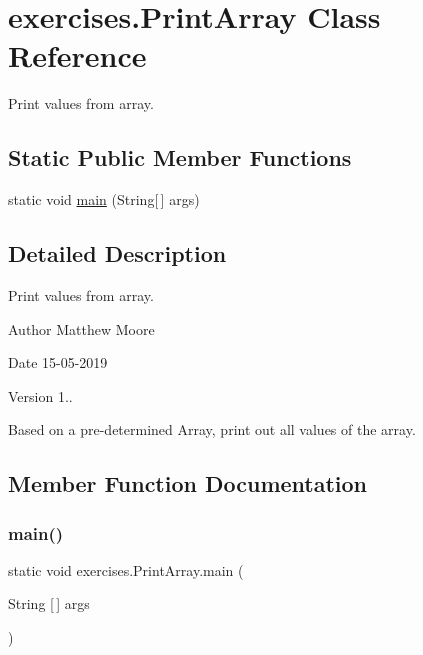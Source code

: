 \hypertarget{classexercises_1_1_print_array}{}\section{exercises.\+Print\+Array Class Reference}
\label{classexercises_1_1_print_array}


Print values from array.  


\subsection*{Static Public Member Functions}
\begin{DoxyCompactItemize}
\item 
static void \mbox{\hyperlink{classexercises_1_1_print_array_a2d15a4db8f6a379a3d838f12c02fb85b}{main}} (String\mbox{[}$\,$\mbox{]} args)
\end{DoxyCompactItemize}


\subsection{Detailed Description}
Print values from array. 

\begin{DoxyAuthor}{Author}
Matthew Moore 
\end{DoxyAuthor}
\begin{DoxyDate}{Date}
15-\/05-\/2019 
\end{DoxyDate}
\begin{DoxyVersion}{Version}
1..
\end{DoxyVersion}
Based on a pre-\/determined Array, print out all values of the array. 

\subsection{Member Function Documentation}
\mbox{\label{classexercises_1_1_print_array_a2d15a4db8f6a379a3d838f12c02fb85b}} 
\subsubsection{\texorpdfstring{main()}{main()}}
{\footnotesize\ttfamily static void exercises.\+Print\+Array.\+main (\begin{DoxyParamCaption}\item[{String \mbox{[}$\,$\mbox{]}}]{args }\end{DoxyParamCaption})\hspace{0.3cm}{\ttfamily [static]}}


